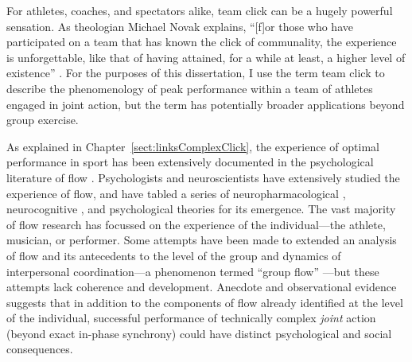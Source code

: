 \begin{CJK}{UTF8}{gbsn}

For athletes, coaches, and spectators alike, team click can be a hugely powerful sensation.  As theologian Michael Novak explains, ``[f]or those who have participated on a team that has known the click of communality, the experience is unforgettable, like that of having attained, for a while at least, a higher level of existence'' \citep[11]{White2011}. For the purposes of this dissertation, I use the term team click to describe the phenomenology of peak performance within a team of athletes engaged in joint action, but the term has potentially broader applications beyond group exercise.

As explained in Chapter~\ref{sect:linksComplexClick}, the experience of optimal performance in sport has been extensively documented in the psychological literature of flow \citep{Csikszentmihalyi1992,Jackson1995,Jackson1999,McNeill1995}.  Psychologists and neuroscientists have extensively studied the experience of flow, and have tabled a series of neuropharmacological \citep{Boecker2008}, neurocognitive \citep{Dietrich2006,Dietrich2011,Labelle2013}, and psychological \citep{Csikszentmihalyi1992} theories for its emergence.  The vast majority of flow research has focussed on the experience of the individual---the athlete, musician, or performer.  Some attempts have been made to extended an analysis of flow and its antecedents to the level of the group and dynamics of interpersonal coordination---a phenomenon termed ``group flow'' \citep{Sawyer2006}---but these attempts lack coherence and development.  Anecdote and observational evidence suggests that in addition to the components of flow already identified at the level of the individual, successful performance of technically complex
\textit{joint} action (beyond exact in-phase synchrony) could have distinct psychological and social consequences.



\end{CJK}
